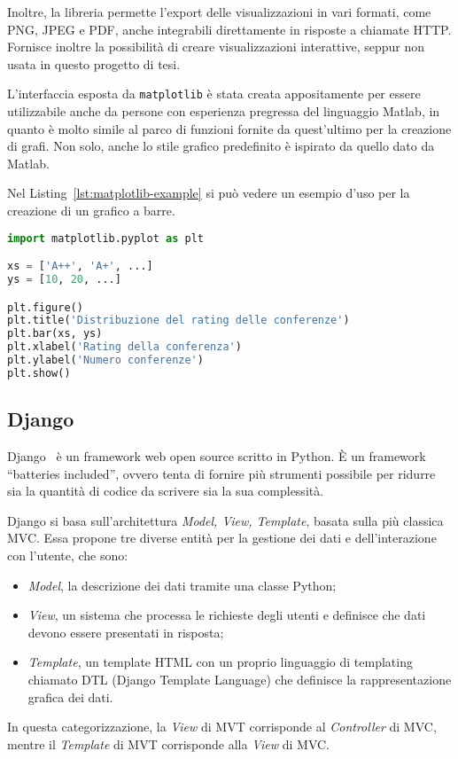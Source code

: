 Inoltre, la libreria permette l'export delle visualizzazioni in vari formati,
come PNG, JPEG e PDF, anche integrabili direttamente in risposte a chiamate HTTP.
Fornisce inoltre la possibilità di creare visualizzazioni interattive, seppur
non usata in questo progetto di tesi.

L'interfaccia esposta da \texttt{matplotlib} è stata creata appositamente per
essere utilizzabile anche da persone con esperienza pregressa del linguaggio
Matlab, in quanto è molto simile al parco di funzioni fornite da quest'ultimo
per la creazione di grafi. Non solo, anche lo stile grafico predefinito è
ispirato da quello dato da Matlab.

Nel Listing~\ref{lst:matplotlib-example} si può vedere un esempio d'uso per
la creazione di un grafico a barre.

\begin{lstlisting}[float, language=Python, caption=Esempio d'uso di \texttt{matplotlib}, label=lst:matplotlib-example]
import matplotlib.pyplot as plt

xs = ['A++', 'A+', ...]
ys = [10, 20, ...]

plt.figure()
plt.title('Distribuzione del rating delle conferenze')
plt.bar(xs, ys)
plt.xlabel('Rating della conferenza')
plt.ylabel('Numero conferenze')
plt.show()
\end{lstlisting}


\subsection{Django}\label{sec:django}

Django~\cite{django} è un framework web open source scritto in Python. È
un framework ``batteries included'', ovvero tenta di fornire più strumenti
possibile per ridurre sia la quantità di codice da scrivere sia la sua
complessità.

Django si basa sull'architettura \textit{Model, View, Template}, basata sulla più
classica MVC. Essa propone tre diverse entità per la gestione dei dati e dell'interazione
con l'utente, che sono:
\begin{itemize}
	\item \textit{Model}, la descrizione dei dati tramite una classe Python;
	\item \textit{View}, un sistema che processa le richieste degli utenti e
	definisce che dati devono essere presentati in risposta;
	\item \textit{Template}, un template HTML con un proprio linguaggio di templating
	chiamato DTL (Django Template Language) che definisce la rappresentazione
	grafica dei dati.
\end{itemize}
In questa categorizzazione, la \textit{View} di MVT corrisponde al \textit{Controller}
di MVC, mentre il \textit{Template} di MVT corrisponde alla \textit{View} di MVC.

